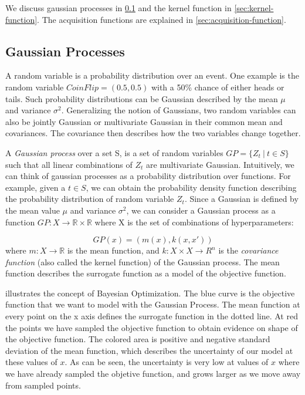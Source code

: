 We discuss gaussian processes in \cref{sec:gp} and the kernel function in \cref{sec:kernel-function}. The acquisition functions are explained in \cref{sec:acquisition-function}.

\subsection{Gaussian Processes}\label{sec:gp}
A random variable is a probability distribution over an event. One example is the random variable $CoinFlip = (0.5, 0.5)$ with a 50\% chance of either heads or tails. Such probability distributions can be Gaussian described by the mean $\mu$ and variance $\sigma^2$. Generalizing the notion of Gaussians, two random variables can also be jointly Gaussian or multivariate Gaussian in their common mean and covariances. The covariance then describes how the two variables change together.

A \emph{Gaussian process} over a set S, is a set of random variables $GP = \{Z_t \ | \ t \in S\}$ such that all linear combinations of $Z_t$ are multivariate Gaussian. Intuitively, we can think of gaussian processes as a probability distribution over functions. For example, given a $t \in S$, we can obtain the probability density function describing the probability distribution of random variable $Z_t$. Since a Gaussian is defined by the mean value $\mu$ and variance $\sigma^2$, we can consider a Gaussian process as a function $GP : X \rightarrow \mathbb{R} \times \mathbb{R}$ where X is the set of combinations of hyperparameters:

\begin{equation}\label{gaussian-process}
GP(x) = (m(x), k(x, x'))
\end{equation}
where $m : X \rightarrow \mathbb{R}$ is the mean function, and $k : X \times X \rightarrow R^n$ is the \emph{covariance function} (also called the kernel function) of the Gaussian process. 
The mean function describes the surrogate function as a model of the objective function.

 illustrates the concept of Bayesian Optimization. The blue curve is the objective function that we want to model with the Gaussian Process. The mean function at every point on the x axis defines the surrogate function in the dotted line. At red the points we have sampled the objective function to obtain evidence on shape of the objective function. The colored area is positive and negative standard deviation of the mean function, which describes the uncertainty of our model at these values of $x$. As can be seen, the uncertainty is very low at values of $x$ where we have already sampled the objetive function, and grows larger as we move away from sampled points.

